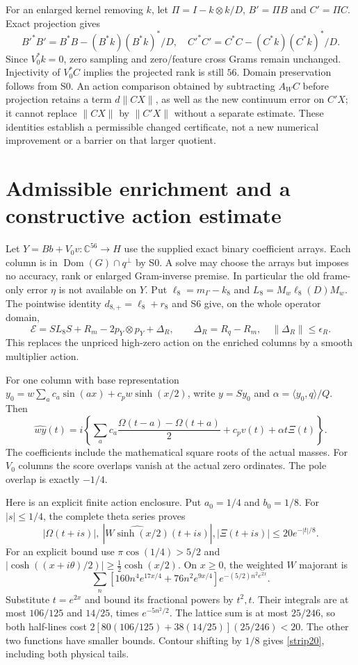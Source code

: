 \documentclass[11pt]{article}
\newcommand{\Dom}{\operatorname{Dom}}
\numberwithin{equation}{section}
\begin{document}
For an enlarged kernel removing $k$, let $\Pi=I-k\otimes k/D$,
$B'=\Pi B$ and $C'=\Pi C$. Exact projection gives
\[
 B'^*B'=B^*B-(B^*k)(B^*k)^*/D,\quad
 C'^*C'=C^*C-(C^*k)(C^*k)^*/D.
\]
Since $V_0^*k=0$, zero sampling and zero/feature cross Grams remain
unchanged. Injectivity of $V_0^*C$ implies the projected rank is still
$56$. Domain preservation follows from S0. An action comparison
obtained by subtracting $A_WC$ before projection retains a term
$d\|CX\|$, as well as the new continuum error on $C'X$; it cannot
replace $\|CX\|$ by $\|C'X\|$ without a separate estimate. These
identities establish a permissible changed certificate, not a new
numerical improvement or a barrier on that larger quotient.

\section{Admissible enrichment and a constructive action estimate}\label{enrich}
Let $Y=Bb+V_0v:\mathbb C^{56}\to H$ use the supplied exact binary
coefficient arrays. Each column is in $\Dom(G)\cap q^\perp$ by S0.
A solve may choose the arrays but imposes no accuracy, rank or enlarged
Gram-inverse premise. In particular the old frame-only error $\eta$
is not available on $Y$.
Put $\ell_8=m_\Gamma-k_8$ and $L_8=M_w\ell_8(D)M_w$.
The pointwise identity $d_{8,+}=\ell_8+r_8$ and S6 give, on the
whole operator domain,
\begin{equation}\label{fullbridge}
 \mathcal E=SL_8S+R_m-2p_Y\otimes p_Y+\Delta_R,
 \qquad\Delta_R=R_q-R_m,\quad\|\Delta_R\|\le\epsilon_R.
\end{equation}
This replaces the unpriced high-zero action on the enriched columns
by a smooth multiplier action.

For one column with base representation
$y_0=w\sum_a c_a\sin(ax)+c_pw\sinh(x/2)$, write
$y=Sy_0$ and $\alpha=\langle y_0,q\rangle/Q$. Then
\begin{equation}\label{exactfourier}
 \widehat{wy}(t)=i\left\{
 \sum_a c_a\frac{\Omega(t-a)-\Omega(t+a)}2
             +c_pv(t)+\alpha t\Xi(t)\right\}.
\end{equation}
The coefficients include the mathematical square roots of the actual
masses. For $V_0$ columns the score overlaps vanish at the actual
zero ordinates. The pole overlap is exactly $-1/4$.

Here is an explicit finite action enclosure. Put $a_0=1/4$ and
$b_0=1/8$. For $|s|\le1/4$, the complete theta series proves
\begin{equation}\label{strip20}
 |\Omega(t+is)|,\ |\widehat{W\sinh(x/2)}(t+is)|,
 |\Xi(t+is)|\le20e^{-|t|/8}.
\end{equation}
For an explicit bound use $\pi\cos(1/4)>5/2$ and
$|\cosh((x+i\theta)/2)|\ge\tfrac12\cosh(x/2)$.
On $x\ge0$, the weighted $W$ majorant is
\[
 \sum_n[160n^4e^{17x/4}+76n^2e^{9x/4}]
                         e^{-(5/2)n^2e^{2x}}.
\]
Substitute $t=e^{2x}$ and bound its fractional powers by $t^2,t$.
Their integrals are at most $106/125$ and $14/25$, times
$e^{-5n^2/2}$. The lattice sum is at most $25/246$, so both
half-lines cost
$2[80(106/125)+38(14/25)](25/246)<20$.
The other two functions have smaller bounds. Contour shifting by
$1/8$ gives \eqref{strip20}, including both physical tails.
\end{document}
